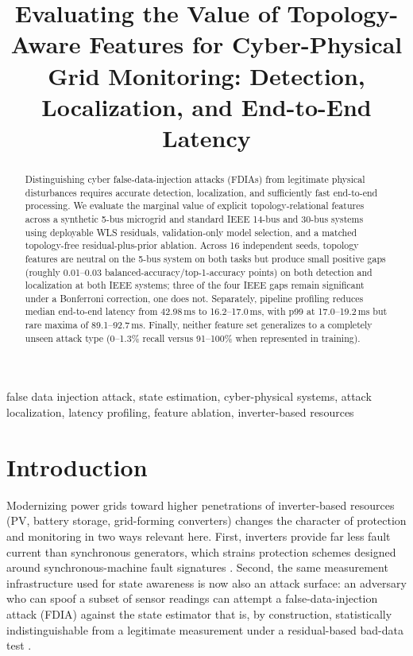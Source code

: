 \documentclass[conference]{IEEEtran}
\begin{document}
\title{Evaluating the Value of Topology-Aware Features for Cyber-Physical Grid Monitoring: Detection, Localization, and End-to-End Latency}

\author{
}

\maketitle

\begin{abstract}
Distinguishing cyber false-data-injection attacks (FDIAs) from legitimate physical disturbances requires accurate detection, localization, and sufficiently fast end-to-end processing. We evaluate the marginal value of explicit topology-relational features across a synthetic 5-bus microgrid and standard IEEE 14-bus and 30-bus systems using deployable WLS residuals, validation-only model selection, and a matched topology-free residual-plus-prior ablation. Across 16 independent seeds, topology features are neutral on the 5-bus system on both tasks but produce small positive gaps (roughly 0.01--0.03 balanced-accuracy/top-1-accuracy points) on both detection and localization at both IEEE systems; three of the four IEEE gaps remain significant under a Bonferroni correction, one does not. Separately, pipeline profiling reduces median end-to-end latency from 42.98\,ms to 16.2--17.0\,ms, with p99 at 17.0--19.2\,ms but rare maxima of 89.1--92.7\,ms. Finally, neither feature set generalizes to a completely unseen attack type (0--1.3\% recall versus 91--100\% when represented in training).
\end{abstract}

\begin{IEEEkeywords}
false data injection attack, state estimation, cyber-physical systems, attack localization, latency profiling, feature ablation, inverter-based resources
\end{IEEEkeywords}

\section{Introduction}

Modernizing power grids toward higher penetrations of inverter-based resources (PV, battery storage, grid-forming converters) changes the character of protection and monitoring in two ways relevant here. First, inverters provide far less fault current than synchronous generators, which strains protection schemes designed around synchronous-machine fault signatures \cite{liaqat2026protection}. Second, the same measurement infrastructure used for state awareness is now also an attack surface: an adversary who can spoof a subset of sensor readings can attempt a false-data-injection attack (FDIA) against the state estimator that is, by construction, statistically indistinguishable from a legitimate measurement under a residual-based bad-data test \cite{liu2011false}.
\end{document}

